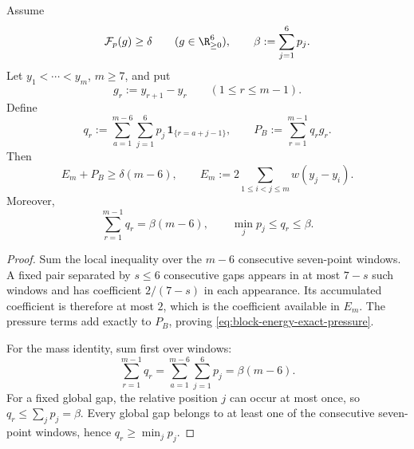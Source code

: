 \begin{proposition}\label{prop:redist}
Assume
\[
 \mathcal F_p(g)\ge\delta
 \qquad(g\in\R_{\ge0}^6),
 \qquad
 \beta:=\sum_{j=1}^6p_j.
\]
Let \(y_1<\cdots<y_m\), \(m\ge7\), and put
\[
 g_r:=y_{r+1}-y_r
 \qquad(1\le r\le m-1).
\]
Define
\begin{equation}\label{eq:qr}
 q_r
 :=
 \sum_{a=1}^{m-6}\sum_{j=1}^6
 p_j\,\mathbf 1_{\{r=a+j-1\}},
 \qquad
 P_B:=\sum_{r=1}^{m-1}q_rg_r .
\end{equation}
Then
\begin{equation}\label{eq:block-energy-exact-pressure}
 E_m+P_B\ge\delta(m-6),
 \qquad
 E_m:=2\sum_{1\le i<j\le m}w(y_j-y_i).
\end{equation}
Moreover,
\begin{equation}\label{eq:pressure-mass}
 \boxed{\sum_{r=1}^{m-1}q_r=\beta(m-6)},
 \qquad
 \min_jp_j\le q_r\le\beta .
\end{equation}
\end{proposition}

\begin{proof}
Sum the local inequality over the \(m-6\) consecutive seven-point windows.
A fixed pair separated by \(s\le6\) consecutive gaps appears in at most
\(7-s\) such windows and has coefficient \(2/(7-s)\) in each appearance.
Its accumulated coefficient is therefore at most \(2\), which is the
coefficient available in \(E_m\).  The pressure terms add exactly to
\(P_B\), proving \eqref{eq:block-energy-exact-pressure}.

For the mass identity, sum first over windows:
\[
 \sum_{r=1}^{m-1}q_r
 =
 \sum_{a=1}^{m-6}\sum_{j=1}^6p_j
 =
 \beta(m-6).
\]
For a fixed global gap, the relative position \(j\) can occur at most once,
so \(q_r\le\sum_jp_j=\beta\).  Every global gap belongs to at least one of
the consecutive seven-point windows, hence \(q_r\ge\min_jp_j\).
\end{proof}
